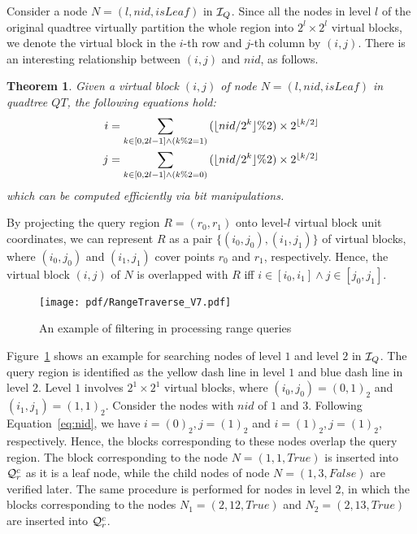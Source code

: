 \documentclass[10pt,conference,letterpaper]{IEEEtran}
\newcommand{\rangecand}{{{\cal Q}_r^c}\xspace}
\newcommand{\treeindex}{{{\cal I}_Q}\xspace}
\newtheorem{theorem}{Theorem}
\begin{document}
Consider a node $N=(l,nid, isLeaf)$ in $\treeindex$.
Since all the nodes in level $l$ of the original quadtree virtually partition the whole region into $2^l\times 2^l$ virtual blocks, we denote the virtual block in the $i$-th row and $j$-th column by $(i,j)$. There is an interesting relationship between $(i,j)$ and $nid$, as follows.
\begin{theorem}
	Given a virtual block $(i,j)$ of node $N=(l,nid, isLeaf)$ in quadtree $QT$, the following equations hold:
	\begin{equation}\label{eq:nid}
	\small
	\begin{aligned}
	i &= \sum_{k\in[0, 2l-1]\wedge (k\%2=1)} {(\lfloor nid/2^k \rfloor\% 2) \times2^{\lfloor k/2\rfloor}} \\
	j &= \sum_{k\in[0, 2l-1]\wedge (k\%2=0)} {(\lfloor nid/2^k \rfloor\% 2) \times2^{\lfloor k/2\rfloor}}
	\end{aligned}
	\end{equation}
	which can be computed efficiently via bit manipulations.
\end{theorem}

By projecting the query region $R=(r_0, r_1)$ onto level-$l$ virtual block unit coordinates, we can represent $R$ as a pair $\{(i_0,j_0), (i_1,j_1)\}$ of virtual blocks, where $(i_0,j_0)$ and $(i_1,j_1)$ cover points $r_0$ and $r_1$, respectively.
Hence, the virtual block $(i,j)$ of $N$ is overlapped with $R$ iff
$i\in[i_0, i_1]\wedge j\in[j_0, j_1]$.

\begin{figure}[t]
	\centering
	\texttt{[image: pdf/RangeTraverse\_V7.pdf]}
	\caption{An example of filtering in processing range queries \label{fig:RangeFilter}}
	\vspace{-.1in}
\end{figure}

Figure~\ref{fig:RangeFilter} shows an example for searching nodes of level $1$ and level $2$ in $\treeindex$. The query region is identified as the yellow dash line in level $1$ and blue dash line in level $2$. Level $1$ involves $2^1\times 2^1$ virtual blocks, where $(i_0,j_0)=(0, 1)_2$ and $(i_1,j_1)=(1, 1)_2$. Consider the nodes with $nid$ of $1$ and $3$. Following Equation~\ref{eq:nid}, we have $i=(0)_2, j=(1)_2$ and $i=(1)_2, j=(1)_2$, respectively. Hence, the blocks corresponding to these nodes overlap the query region. The block corresponding to the node $N=(1,1,True)$ is inserted into $\rangecand$ as it is a leaf node, while the child nodes of node $N=(1,3,False)$ are verified later. The same procedure is performed for nodes in level $2$, in which the blocks corresponding to the nodes $N_1=(2,12,True)$ and $N_2=(2,13,True)$ are inserted into $\rangecand$.
\end{document}
